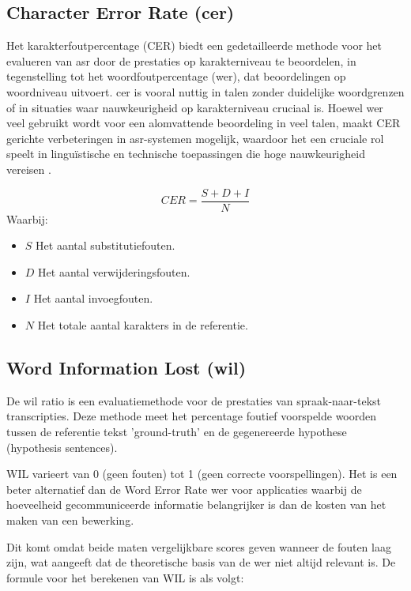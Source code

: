 \subsection{Character Error Rate (\gls{cer})}
Het karakterfoutpercentage (CER) biedt een gedetailleerde methode voor het evalueren van \gls{asr} door de prestaties op karakterniveau te beoordelen, in tegenstelling tot het woordfoutpercentage (\gls{wer}), dat beoordelingen op woordniveau uitvoert. \gls{cer} is vooral nuttig in talen zonder duidelijke woordgrenzen of in situaties waar nauwkeurigheid op karakterniveau cruciaal is. 
Hoewel \gls{wer} veel gebruikt wordt voor een alomvattende beoordeling in veel talen, maakt CER gerichte verbeteringen in \gls{asr}-systemen mogelijk, waardoor het een cruciale rol speelt in linguïstische en technische toepassingen die hoge nauwkeurigheid vereisen \autocite{huggingface2023asr}.

\begin{equation}
    CER = \frac{S + D + I}{N}
\end{equation}
Waarbij:
\begin{itemize}
    \item $S$ Het aantal substitutiefouten.
    \item $D$ Het aantal verwijderingsfouten.
    \item $I$ Het aantal invoegfouten.
    \item $N$ Het totale aantal karakters in de referentie.
\end{itemize}

\subsection{Word Information Lost (\gls{wil})}

De \gls{wil} ratio is een evaluatiemethode voor de prestaties van spraak-naar-tekst transcripties. Deze methode meet het percentage foutief voorspelde woorden tussen de referentie tekst 'ground-truth' en de gegenereerde hypothese (hypothesis sentences). 

WIL varieert van 0 (geen fouten) tot 1 (geen correcte voorspellingen). Het is een beter alternatief dan de Word Error Rate \gls{wer} voor applicaties waarbij de hoeveelheid gecommuniceerde informatie belangrijker is dan de kosten van het maken van een bewerking.

Dit komt omdat beide maten vergelijkbare scores geven wanneer de fouten laag zijn, wat aangeeft dat de theoretische basis van de \gls{wer} niet altijd relevant is. De formule voor het berekenen van WIL is als volgt:


